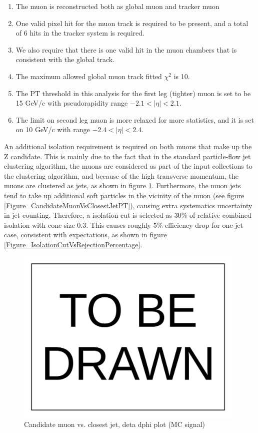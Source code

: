 \documentclass[10pt,a4paper,onecolumn]{article}
\begin{document}
\begin{enumerate}
\item The muon is reconstructed both as global muon and tracker muon
\item One valid pixel hit for the muon track is required to be present, and a total of 6 hits in the tracker system is required.
\item We also require that there is one valid hit in the muon chambers that is consistent with the global track.
\item The maximum allowed global muon track fitted $\chi^2$ is 10.
\item The PT threshold in this analysis for the first leg (tighter) muon is set to be 15 GeV/c with pseudorapidity range $-2.1 < |\eta| < 2.1$.
\item The limit on second leg muon is more relaxed for more statistics, and it is set on 10 GeV/c with range $-2.4 < |\eta| < 2.4$.
\end{enumerate}

An additional isolation requirement is required on both muons that make up the Z candidate.
This is mainly due to the fact that in the standard particle-flow jet clustering algorithm, the muons are considered as part
of the input collections to the clustering algorithm, and because of the high transverse momentum, the muons are clustered
as jets, as shown in figure \ref{Figure_CandidateMuonVsClosestJetEtaPhi}.  Furthermore, the muon jets tend to take up additional soft particles
in the vicinity of the muon (see figure \ref{Figure_CandidateMuonVsClosestJetPT}), causing extra systematics uncertainty in jet-counting.
Therefore, a isolation cut is selected as 30\% of relative combined isolation with cone size 0.3.  This causes roughly 5\%
efficiency drop for one-jet case, consistent with expectations, as shown in figure \ref{Figure_IsolationCutVsRejectionPercentage}.

\begin{figure}
\includegraphics[width=110mm]{ToBeDrawn.pdf}
\caption{Candidate muon vs. closest jet, deta dphi plot (MC signal)}
\label{Figure_CandidateMuonVsClosestJetEtaPhi}
\end{figure}
\end{document}
